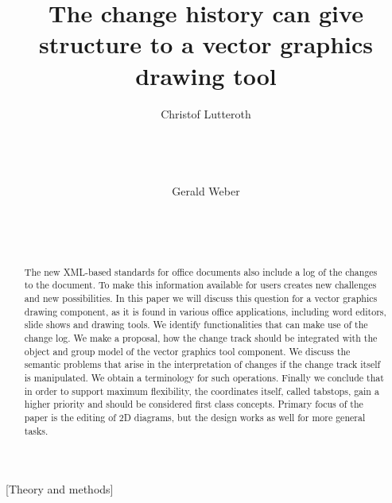 \documentclass{sig-alternate}
\begin{document}

\title{The change history can give structure to a vector graphics drawing tool}

\author {
	\alignauthor Christof Lutteroth\\
       \\
       \\
       \\
       \\
	\alignauthor Gerald Weber\\
       \\
       \\
       \\
}
\date{}
\maketitle

\begin{abstract}
The new XML-based standards for office documents also include a log of the changes to the document. To make this information available for users creates new challenges and new possibilities. In this paper we will discuss this question for a vector graphics drawing component, as it is found in various office applications, including word editors, slide shows and drawing tools. We identify functionalities that can make use of the change log. We make a proposal, how the change track should be integrated with the object and group model of the vector graphics tool component. We discuss the semantic problems that arise in the interpretation of changes if the change track itself is manipulated. We obtain a terminology for such operations. Finally we conclude that in order to support maximum flexibility, the coordinates itself, called tabstops, gain a higher priority and should be considered first class concepts.
Primary focus of the paper is the editing of 2D diagrams, but the design works as well for more general tasks.
\end{abstract}

[Theory and methods]
\end{document}
